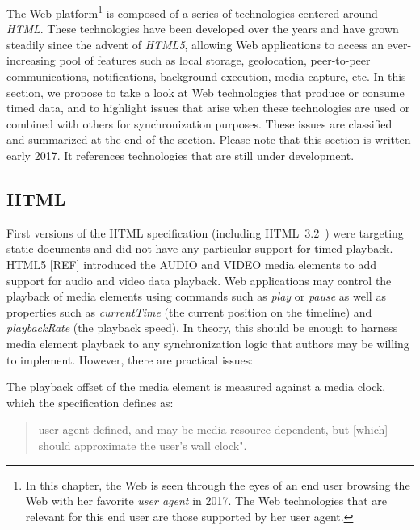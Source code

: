 The Web platform\footnote{In this chapter, the Web is seen through the eyes of
an end user browsing the Web with her favorite \emph{user agent} in 2017. The
Web technologies that are relevant for this end user are those supported by
her user agent.} is composed of a series of technologies centered around \emph{HTML}.
These technologies have been developed over the years and have grown steadily
since the advent of \emph{HTML5}, allowing Web applications to access an 
ever-increasing pool of features such as local storage, geolocation, peer-to-peer
communications, notifications, background execution, media capture, etc. In
this section, we propose to take a look at Web technologies that produce or
consume timed data, and to highlight issues that arise when these technologies
are used or combined with others for synchronization purposes. These issues
are classified and summarized at the end of the section. Please note that this
section is written early 2017. It references technologies that are still under
development.

\subsection {HTML}
\label{sec:web-html}

First versions of the HTML specification (including HTML~3.2~\cite{html32}) were
targeting static documents and did not have any particular support for timed playback. 
HTML5 [REF] introduced the AUDIO and VIDEO media elements to add support for
audio and video data playback. Web applications may control the playback of
media elements using commands such as \emph{play} or \emph{pause} as well as
properties such as \emph{currentTime} (the current position on the timeline)
and \emph{playbackRate} (the playback speed). In theory, this should be enough
to harness media element playback to any synchronization logic that authors
may be willing to implement. However, there are practical issues:

The playback offset of the media element is measured against a media clock, which
the specification defines as:
\begin{quote}
user-agent defined, and may be media resource-dependent, but [which] should approximate the user's wall clock".
\end{quote}

